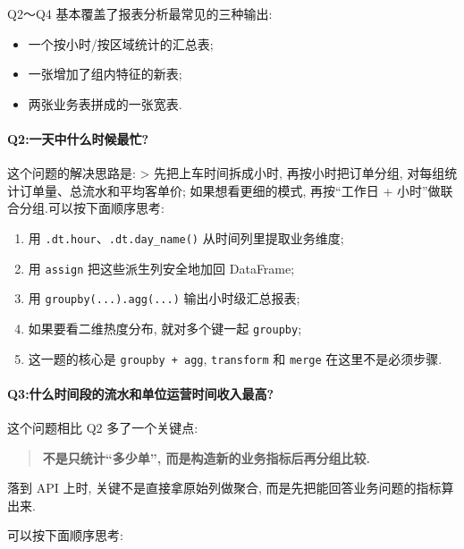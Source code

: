 \documentclass[11pt]{article}
\providecommand{\tightlist}{%
      \setlength{\itemsep}{0pt}\setlength{\parskip}{0pt}}
\begin{document}
    Q2～Q4 基本覆盖了报表分析最常见的三种输出:

\begin{itemize}
\tightlist
\item
  一个按小时/按区域统计的汇总表;
\item
  一张增加了组内特征的新表;
\item
  两张业务表拼成的一张宽表.
\end{itemize}

    \paragraph{Q2:一天中什么时候最忙?}\label{q2ux4e00ux5929ux4e2dux4ec0ux4e48ux65f6ux5019ux6700ux5fd9}

    这个问题的解决思路是: \textgreater{} 先把上车时间拆成小时,
再按小时把订单分组, 对每组统计订单量、总流水和平均客单价;
如果想看更细的模式, 再按``工作日 + 小时''做联合分组.可以按下面顺序思考:

\begin{enumerate}
\def\labelenumi{\arabic{enumi}.}
\tightlist
\item
  用 \texttt{.dt.hour}、\texttt{.dt.day\_name()} 从时间列里提取业务维度;
\item
  用 \texttt{assign} 把这些派生列安全地加回 DataFrame;
\item
  用 \texttt{groupby(...).agg(...)} 输出小时级汇总报表;
\item
  如果要看二维热度分布, 就对多个键一起 \texttt{groupby};
\item
  这一题的核心是 \texttt{groupby\ +\ agg}, \texttt{transform} 和
  \texttt{merge} 在这里不是必须步骤.
\end{enumerate}

    \paragraph{Q3:什么时间段的流水和单位运营时间收入最高?}\label{q3ux4ec0ux4e48ux65f6ux95f4ux6bb5ux7684ux6d41ux6c34ux548cux5355ux4f4dux8fd0ux8425ux65f6ux95f4ux6536ux5165ux6700ux9ad8}

    这个问题相比 Q2 多了一个关键点:

\begin{quote}
\textbf{不是只统计``多少单'', 而是构造新的业务指标后再分组比较.}
\end{quote}

落到 API 上时, 关键不是直接拿原始列做聚合,
而是先把能回答业务问题的指标算出来.

可以按下面顺序思考:
\end{document}
